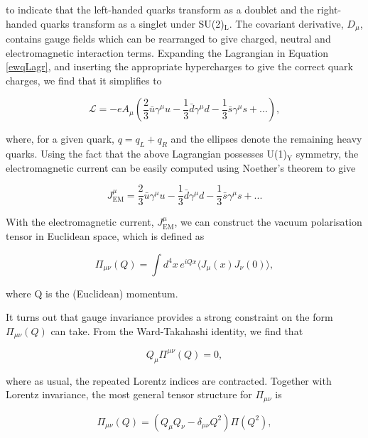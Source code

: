 \documentclass{article}
\numberwithin{equation}{section} %
\begin{document}
\noindent to indicate that the left-handed quarks transform as a doublet and the right-handed quarks transform as a singlet under SU(2)$_\mathrm{L}$. The covariant derivative, $D_\mu$, contains gauge fields which can be rearranged to give charged, neutral and electromagnetic interaction terms. 
Expanding the Lagrangian in Equation \ref{ewqLagr}, and inserting the appropriate hypercharges to give the correct quark charges, we find that it simplifies to

\begin{equation}
\mathcal{L}=-eA_\mu\left(\frac{2}{3}\bar{u}\gamma^\mu u -\frac{1}{3}\bar{d}\gamma^\mu d -\frac{1}{3}\bar{s}\gamma^\mu s + ...\right),
\end{equation}

\noindent where, for a given quark, $q=q_L + q_R$ and the ellipses denote the remaining heavy quarks. Using the fact that the above Lagrangian possesses U(1)$_\mathrm{Y}$ symmetry, the electromagnetic current can be easily computed using Noether's theorem to give

\begin{equation}
J_\mathrm{EM}^\mu = \frac{2}{3}\bar{u}\gamma^\mu u -\frac{1}{3}\bar{d}\gamma^\mu d -\frac{1}{3}\bar{s}\gamma^\mu s + ...
\end{equation}

With the electromagnetic current, $J_\mathrm{EM}^\mu$, we can construct the vacuum polarisation tensor in Euclidean space, which is defined as

\begin{equation}
\Pi_{\mu\nu}(Q) = \int d^4x \, e^{iQx} \langle J_\mu(x) J_\nu(0)\rangle,
\end{equation}

\noindent where Q is the (Euclidean) momentum. 

It turns out that gauge invariance provides a strong constraint on the form $\Pi_{\mu\nu}(Q)$ can take. From the Ward-Takahashi identity\cite{zee}, we find that 

\begin{equation}
Q_\mu\Pi^{\mu\nu}(Q)=0,
\end{equation}

\noindent where as usual, the repeated Lorentz indices are contracted. Together with Lorentz invariance, the most general tensor structure for $\Pi_{\mu\nu}$ is

\begin{equation}
\Pi_{\mu\nu}(Q) =\left(Q_\mu Q_\nu - \delta_{\mu\nu}Q^2 \right)\Pi(Q^2),
\label{tensor structure}
\end{equation}
\end{document}
